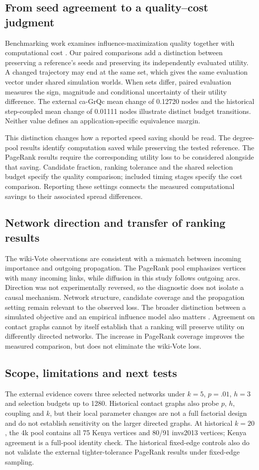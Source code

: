 \documentclass[smallextended]{svjour3}
\begin{document}
\subsection{From seed agreement to a quality--cost judgment}
Benchmarking work examines influence-maximization quality together with computational cost \cite{ref16}. Our paired comparisons add a distinction between preserving a reference's seeds and preserving its independently evaluated utility. A changed trajectory may end at the same set, which gives the same evaluation vector under shared simulation worlds. When sets differ, paired evaluation measures the sign, magnitude and conditional uncertainty of their utility difference. The external ca-GrQc mean change of 0.12720 nodes and the historical step-coupled mean change of 0.01111 nodes illustrate distinct budget transitions. Neither value defines an application-specific equivalence margin.

This distinction changes how a reported speed saving should be read. The degree-pool results identify computation saved while preserving the tested reference. The PageRank results require the corresponding utility loss to be considered alongside that saving. Candidate fraction, ranking tolerance and the shared selection budget specify the quality comparison; included timing stages specify the cost comparison. Reporting these settings connects the measured computational savings to their associated spread differences.

\subsection{Network direction and transfer of ranking results}
The wiki-Vote observations are consistent with a mismatch between incoming importance and outgoing propagation. The PageRank pool emphasizes vertices with many incoming links, while diffusion in this study follows outgoing arcs. Direction was not experimentally reversed, so the diagnostic does not isolate a causal mechanism. Network structure, candidate coverage and the propagation setting remain relevant to the observed loss. The broader distinction between a simulated objective and an empirical influence model also matters \cite{ref15}. Agreement on contact graphs cannot by itself establish that a ranking will preserve utility on differently directed networks. The increase in PageRank coverage improves the measured comparison, but does not eliminate the wiki-Vote loss.

\subsection{Scope, limitations and next tests}
The external evidence covers three selected networks under $k=5$, $p=.01$, $h=3$ and selection budgets up to 1280. Historical contact graphs also probe $p$, $h$, coupling and $k$, but their local parameter changes are not a full factorial design and do not establish sensitivity on the larger directed graphs. At historical $k=20$, the 4k pool contains all 75 Kenya vertices and 80/91 invs2013 vertices; Kenya agreement is a full-pool identity check. The historical fixed-edge controls also do not validate the external tighter-tolerance PageRank results under fixed-edge sampling.
\end{document}
